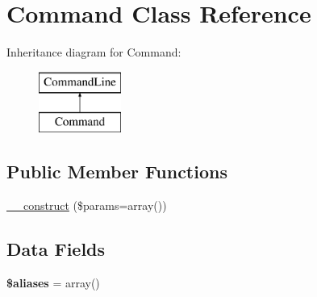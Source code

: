 \hypertarget{class_p_e_a_r2_1_1_console_1_1_command_line_1_1_command}{
\section{\-Command \-Class \-Reference}
\label{class_p_e_a_r2_1_1_console_1_1_command_line_1_1_command}
}
\-Inheritance diagram for \-Command\-:\begin{figure}[H]
\begin{center}
\leavevmode
\includegraphics[height=2.000000cm]{class_p_e_a_r2_1_1_console_1_1_command_line_1_1_command}
\end{center}
\end{figure}
\subsection*{\-Public \-Member \-Functions}
\begin{DoxyCompactItemize}
\item 
\hyperlink{class_p_e_a_r2_1_1_console_1_1_command_line_1_1_command_a568ecdb0d73d2a870f33189739922a50}{\-\_\-\-\_\-construct} (\$params=array())
\end{DoxyCompactItemize}
\subsection*{\-Data \-Fields}
\begin{DoxyCompactItemize}
\item 
\hypertarget{class_p_e_a_r2_1_1_console_1_1_command_line_1_1_command_a7e6d29edbd9ec5d8ec9d478cf98fba03}{
{\bfseries \$aliases} = array()}
\label{class_p_e_a_r2_1_1_console_1_1_command_line_1_1_command_a7e6d29edbd9ec5d8ec9d478cf98fba03}

\end{DoxyCompactItemize}


